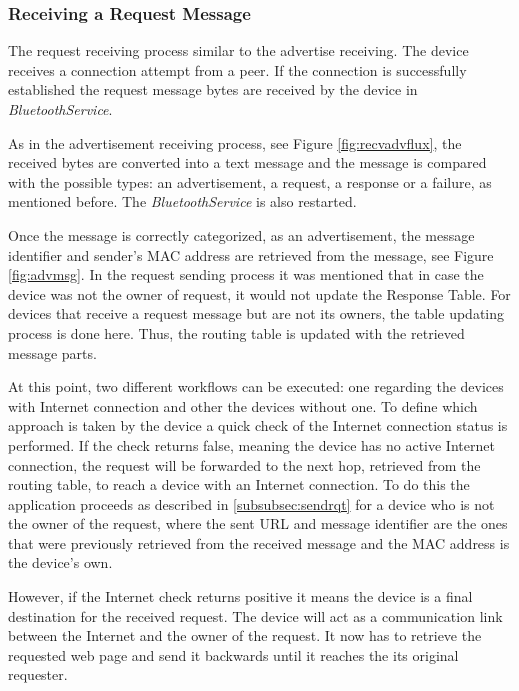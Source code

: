 \subsubsection{Receiving a Request Message}
\label{subsubsec:rcvrqt}

The request receiving process similar to the advertise receiving. The device receives a connection attempt from a peer. If the connection is successfully established the request message bytes are received by the device in \textit{BluetoothService}.

As in the advertisement receiving process, see Figure \ref{fig:recvadvflux}, the received bytes are converted into a text message and the message is compared with the possible types: an advertisement, a request, a response or a failure, as mentioned before. The \textit{BluetoothService} is also restarted.

Once the message is correctly categorized, as an advertisement, the message identifier and sender's \gls{MAC} address are retrieved from the message, see Figure \ref{fig:advmsg}. In the request sending process it was mentioned that in case the device was not the owner of request, it would not update the Response Table. For devices that receive a request message but are not its owners, the table updating process is done here. Thus, the routing table is updated with the retrieved message parts.

At this point, two different workflows can be executed: one regarding the devices with Internet connection and other the devices without one. To define which approach is taken by the device a quick check of the Internet connection status is performed. If the check returns false, meaning the device has no active Internet connection, the request will be forwarded to the next hop, retrieved from the routing table, to reach a device with an Internet connection. To do this the application proceeds as described in \ref{subsubsec:sendrqt} for a device who is not the owner of the request, where the sent \gls{URL} and message identifier are the ones that were previously retrieved from the received message and the \gls{MAC} address is the device's own.

However, if the Internet check returns positive it means the device is a final destination for the received request. The device will act as a communication link between the Internet and the owner of the request. It now has to retrieve the requested web page and send it backwards until it reaches the its original requester.


